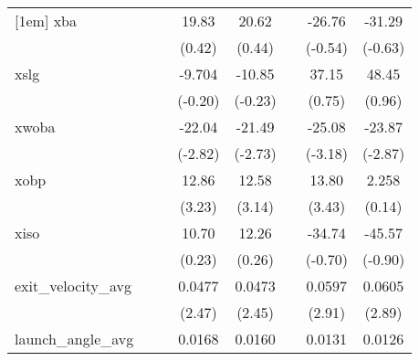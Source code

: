 {\begin{tabular}{l*{7}{c}}
[1em]
xba         &                     &                     &       19.83         &       20.62         &                     &      -26.76         &      -31.29         \\
            &                     &                     &      (0.42)         &      (0.44)         &                     &     (-0.54)         &     (-0.63)         \\
[1em]
xslg        &                     &                     &      -9.704         &      -10.85         &                     &       37.15         &       48.45         \\
            &                     &                     &     (-0.20)         &     (-0.23)         &                     &      (0.75)         &      (0.96)         \\
[1em]
xwoba       &                     &                     &      -22.04\sym{**} &      -21.49\sym{**} &                     &      -25.08\sym{**} &      -23.87\sym{**} \\
            &                     &                     &     (-2.82)         &     (-2.73)         &                     &     (-3.18)         &     (-2.87)         \\
[1em]
xobp        &                     &                     &       12.86\sym{**} &       12.58\sym{**} &                     &       13.80\sym{***}&       2.258         \\
            &                     &                     &      (3.23)         &      (3.14)         &                     &      (3.43)         &      (0.14)         \\
[1em]
xiso        &                     &                     &       10.70         &       12.26         &                     &      -34.74         &      -45.57         \\
            &                     &                     &      (0.23)         &      (0.26)         &                     &     (-0.70)         &     (-0.90)         \\
[1em]
exit\_velocity\_avg&                     &                     &      0.0477\sym{*}  &      0.0473\sym{*}  &                     &      0.0597\sym{**} &      0.0605\sym{**} \\
            &                     &                     &      (2.47)         &      (2.45)         &                     &      (2.91)         &      (2.89)         \\
[1em]
launch\_angle\_avg&                     &                     &      0.0168\sym{*}  &      0.0160\sym{*}  &                     &      0.0131         &      0.0126         \\

\end{tabular}}

